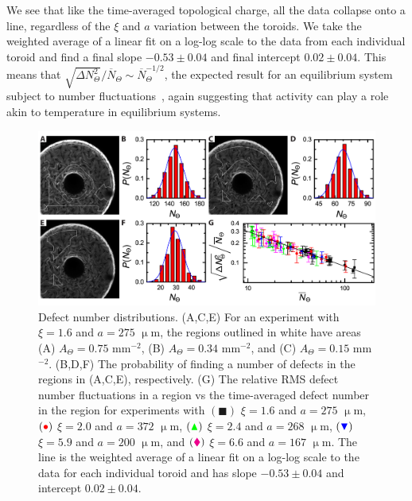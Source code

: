 We see that like the time-averaged topological charge, all the data collapse onto a line, regardless of the $\xi$ and $a$ variation between the toroids.
We take the weighted average of a linear fit on a log-log scale to the data from each individual toroid and find a final slope $-0.53 \pm 0.04$ and final intercept $0.02 \pm 0.04$.
This means that $\displaystyle{\sqrt{\Delta N_{\Theta}^2}} \bigg / \displaystyle {\overbar{N}_{\Theta}} \sim \overbar{N}_{\Theta}^{-1/2}$, the expected result for an equilibrium system subject to number fluctuations~\cite{RN311}, again suggesting that activity can play a role akin to temperature in equilibrium systems.
\begin{figure}
  \centering
  \includegraphics{figures/C3/Ch3-Figs_ExpDistribution.png}
  \caption{Defect number distributions.
  (A,C,E) For an experiment with $\xi = 1.6$ and $a = 275$ $\upmu$m, the regions outlined in white have areas (A) $A_{\Theta} = 0.75$ mm$^{-2}$, (B) $A_{\Theta} = 0.34$ mm$^{-2}$, and (C) $A_{\Theta} = 0.15$ mm$^{-2}$.
  (B,D,F) The probability of finding a number of defects in the regions in (A,C,E), respectively.
  (G) The relative RMS defect number fluctuations in a region vs the time-averaged defect number in the region for experiments with
  $({\blacksquare})$ $\xi = 1.6 $ and $a = 275$ $\upmu$m,
  $({\color{red} \bullet})$ $\xi = 2.0 $ and $a = 372$ $\upmu$m,
  $({\color{green} \blacktriangle})$ $\xi = 2.4 $ and $a = 268$ $\upmu$m,
  $({\color{blue} \blacktriangledown})$ $\xi = 5.9$ and $a = 200$ $\upmu$m, and
  $({\color{magenta} \blacklozenge})$ $\xi = 6.6$ and $a = 167$ $\upmu$m.
  The line is the weighted average of a linear fit on a log-log scale to the data for each individual toroid and has slope $-0.53 \pm 0.04$ and intercept $0.02 \pm 0.04$.}\label{f:3-ExpDistribution}
\end{figure}



